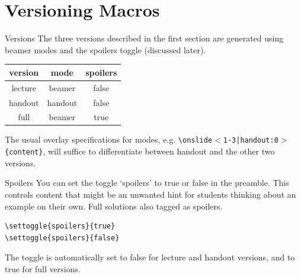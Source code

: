 \documentclass[10pt]{beamer}
\begin{document}
\section{Versioning Macros}
\frame{\tableofcontents[currentsection]}
\begin{frame}{Versions}
The three versions described in the first section are generated using beamer modes and the spoilers toggle (discussed later).
\begin{center}
\begin{tabular}{|c||c|c|}
\hline
\textbf{version} & \textbf{mode} & \textbf{spoilers}
\\ \hline
lecture & beamer & false
\\ \hline
handout & handout & false
\\ \hline
full & beamer & true
\\ \hline
\end{tabular}
\end{center}
\vfill
The usual overlay specifications for modes, e.g. \texttt{\textbackslash onslide$<$1-3|handout:0$>$\{content\}}, will suffice to differentiate between handout and the other two versions.
\end{frame}
\begin{frame}[fragile]{Spoilers}
You can set the toggle `spoilers' to true or false in the preamble. This controls content that might be an unwanted hint for students thinking about an example on their own. Full solutions also tagged as spoilers.\vfill
\begin{verbatim}
\settoggle{spoilers}{true}
\settoggle{spoilers}{false}
\end{verbatim}\vfill

The toggle is automatically set to false for lecture and handout versions, and to true for full versions.\vfill

\end{frame}
\end{document}
